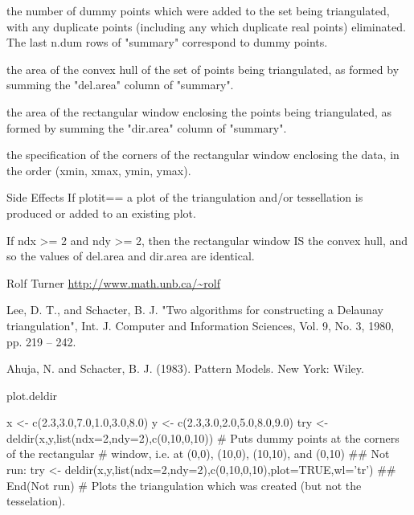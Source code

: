 \begin{Value}
\begin{ldescription}
\item[\code{n.dum}] the number of dummy points which were added to the set being triangulated,
with any duplicate points (including any which duplicate real points)
eliminated.  The last n.dum rows of "summary" correspond to dummy
points.

\item[\code{del.area}] the area of the convex hull of the set of points being triangulated,
as formed by summing the "del.area" column of "summary".

\item[\code{dir.area}] the area of the rectangular window enclosing the points being triangulated,
as formed by summing the "dir.area" column of "summary".

\item[\code{rw}] the specification of the corners of the rectangular window enclosing
the data, in the order (xmin, xmax, ymin, ymax).

\end{ldescription}
\end{Value}
\begin{Section}{Side Effects}
If plotit== a plot of the triangulation and/or tessellation is produced
or added to an existing plot.
\end{Section}
\begin{Note}\relax
If ndx >= 2 and ndy >= 2, then the rectangular window IS the convex
hull, and so the values of del.area and dir.area are identical.
\end{Note}
\begin{Author}\relax
Rolf Turner
\url{http://www.math.unb.ca/~rolf}
\end{Author}
\begin{References}\relax
Lee, D. T., and Schacter, B. J.  "Two algorithms for constructing a
Delaunay triangulation", Int. J. Computer and Information
Sciences, Vol. 9, No. 3, 1980, pp. 219 -- 242.

Ahuja, N. and Schacter, B. J. (1983). Pattern Models.  New York: Wiley.
\end{References}
\begin{SeeAlso}\relax
plot.deldir
\end{SeeAlso}
\begin{Examples}
\begin{ExampleCode}
x   <- c(2.3,3.0,7.0,1.0,3.0,8.0)
y   <- c(2.3,3.0,2.0,5.0,8.0,9.0)
try <- deldir(x,y,list(ndx=2,ndy=2),c(0,10,0,10))
# Puts dummy points at the corners of the rectangular
# window, i.e. at (0,0), (10,0), (10,10), and (0,10)
## Not run: 
try <- deldir(x,y,list(ndx=2,ndy=2),c(0,10,0,10),plot=TRUE,wl='tr')
## End(Not run)
# Plots the triangulation which was created (but not the tesselation).
\end{ExampleCode}
\end{Examples}

